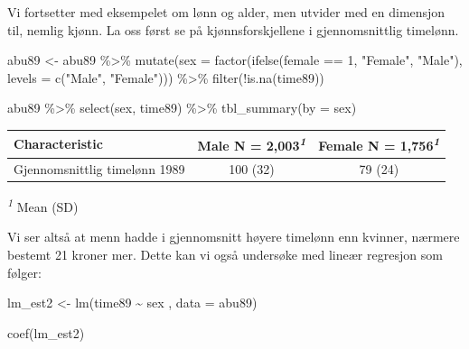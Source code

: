 \documentclass[
  norsk,
  letterpaper,
  DIV=11,
  numbers=noendperiod]{scrreprt}
\newenvironment{Shaded}{\begin{snugshade}}{\end{snugshade}}
\newcommand{\AttributeTok}[1]{\textcolor[rgb]{0.40,0.45,0.13}{#1}}
\newcommand{\DecValTok}[1]{\textcolor[rgb]{0.68,0.00,0.00}{#1}}
\newcommand{\FunctionTok}[1]{\textcolor[rgb]{0.28,0.35,0.67}{#1}}
\newcommand{\NormalTok}[1]{\textcolor[rgb]{0.00,0.23,0.31}{#1}}
\newcommand{\OtherTok}[1]{\textcolor[rgb]{0.00,0.23,0.31}{#1}}
\newcommand{\SpecialCharTok}[1]{\textcolor[rgb]{0.37,0.37,0.37}{#1}}
\newcommand{\StringTok}[1]{\textcolor[rgb]{0.13,0.47,0.30}{#1}}
\theoremstyle{definition}
\theoremstyle{remark}
\begin{document}
Vi fortsetter med eksempelet om lønn og alder, men utvider med en
dimensjon til, nemlig kjønn. La oss først se på kjønnsforskjellene i
gjennomsnittlig timelønn.

\begin{Shaded}
\begin{Highlighting}[]
\NormalTok{abu89 }\OtherTok{\textless{}{-}}\NormalTok{ abu89 }\SpecialCharTok{\%\textgreater{}\%}
  \FunctionTok{mutate}\NormalTok{(}\AttributeTok{sex =} \FunctionTok{factor}\NormalTok{(}\FunctionTok{ifelse}\NormalTok{(female }\SpecialCharTok{==} \DecValTok{1}\NormalTok{, }\StringTok{"Female"}\NormalTok{, }\StringTok{"Male"}\NormalTok{), }\AttributeTok{levels =} \FunctionTok{c}\NormalTok{(}\StringTok{"Male"}\NormalTok{, }\StringTok{"Female"}\NormalTok{))) }\SpecialCharTok{\%\textgreater{}\%} 
  \FunctionTok{filter}\NormalTok{(}\SpecialCharTok{!}\FunctionTok{is.na}\NormalTok{(time89))}

\NormalTok{abu89 }\SpecialCharTok{\%\textgreater{}\%} 
  \FunctionTok{select}\NormalTok{(sex, time89) }\SpecialCharTok{\%\textgreater{}\%} 
  \FunctionTok{tbl\_summary}\NormalTok{(}\AttributeTok{by =}\NormalTok{ sex) }
\end{Highlighting}
\end{Shaded}

\begin{table}
\fontsize{12.0pt}{14.0pt}\selectfont
\begin{tabular*}{\linewidth}{@{\extracolsep{\fill}}lcc}
\toprule
\textbf{Characteristic} & \textbf{Male}  N = 2,003\textsuperscript{\textit{1}} & \textbf{Female}  N = 1,756\textsuperscript{\textit{1}} \\ 
\midrule\addlinespace[2.5pt]
Gjennomsnittlig timelønn 1989 & 100 (32) & 79 (24) \\ 
\bottomrule
\end{tabular*}
\begin{minipage}{\linewidth}
\vspace{.05em}
\textsuperscript{\textit{1}} Mean (SD)\\
\end{minipage}
\end{table}

Vi ser altså at menn hadde i gjennomsnitt høyere timelønn enn kvinner,
nærmere bestemt 21 kroner mer. Dette kan vi også undersøke med lineær
regresjon som følger:

\begin{Shaded}
\begin{Highlighting}[]
\NormalTok{lm\_est2 }\OtherTok{\textless{}{-}} \FunctionTok{lm}\NormalTok{(time89 }\SpecialCharTok{\textasciitilde{}}\NormalTok{ sex , }\AttributeTok{data =}\NormalTok{ abu89)}

\FunctionTok{coef}\NormalTok{(lm\_est2)}
\end{Highlighting}
\end{Shaded}
\end{document}
